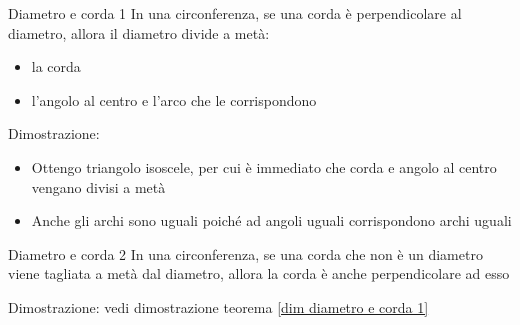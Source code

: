 \begin{teorema}{Diametro e corda 1}
	In una circonferenza, se una corda è perpendicolare al diametro, allora il diametro divide a metà:
	\begin{itemize}
		\item la corda
		\item l'angolo al centro e l'arco che le corrispondono
	\end{itemize}
\end{teorema}
Dimostrazione: \label{dim diametro e corda 1}
\begin{itemize}
	\item Ottengo triangolo isoscele, per cui è immediato che corda e angolo al centro vengano divisi a metà
	\item Anche gli archi sono uguali poiché ad angoli uguali corrispondono archi uguali
\end{itemize}
\begin{teorema}{Diametro e corda 2}
	In una circonferenza, se una corda che non è un diametro viene tagliata a metà dal diametro, allora la corda è anche perpendicolare ad esso
\end{teorema}
Dimostrazione: vedi dimostrazione teorema \ref{dim diametro e corda 1}
